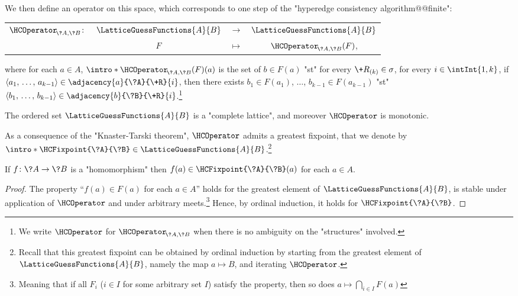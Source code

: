 We then define an operator on this space, which corresponds to one step of the "hyperedge consistency algorithm@@finite":
\begin{center}
	\begin{tabular}{rccc}
		$\HCOperator_{\!\?A,\?B}\colon$ & $\LatticeGuessFunctions{A}{B}$ & $\to$ & $\LatticeGuessFunctions{A}{B}$ \\
		& $F$ & $\mapsto$ & $\HCOperator_{\!\?A,\?B}(F)$,
	\end{tabular}
\end{center}
where for each $a \in A$, \AP$\intro*\HCOperator_{\!\?A,\?B}(F)(a)$ is the set of $b \in F(a)$ "st"
for every $\+R_{(k)} \in \sigma$, for every $i \in \intInt{1,k}$,
if $\langle a_1,\, \dotsc,\, a_{k-1} \rangle \in \adjacency{a}{\?A}{\+R}{i}$,
then there exists $b_1 \in F(a_1)$, $\dotsc$, $b_{k-1} \in F(a_{k-1})$ "st" 
$\langle b_1,\, \dotsc,\, b_{k-1} \rangle \in \adjacency{b}{\?B}{\+R}{i}$.\footnote{%
We write $\HCOperator$ for $\HCOperator_{\!\?A,\?B}$ when there is no ambiguity on
the "structures" involved.}

\begin{fact}
	The ordered set $\LatticeGuessFunctions{A}{B}$ is a "complete lattice",
	and moreover $\HCOperator$ is monotonic.
\end{fact}

As a consequence of the "Knaster-Tarski theorem", $\HCOperator$ admits a greatest fixpoint, that
we denote by \AP$\intro*\HCFixpoint{\?A}{\?B} \in \LatticeGuessFunctions{A}{B}$.\footnote{Recall 
that this greatest fixpoint can be obtained by ordinal induction by starting from
the greatest element of $\LatticeGuessFunctions{A}{B}$, namely the map $a \mapsto B$,
and iterating $\HCOperator$.}

\begin{proposition}
	\AP\label{prop:existence-homomorphism-implies-lowerbound-HC}
	If $f\colon \?A \to \?B$ is a "homomorphism" then $f(a) \in \HCFixpoint{\?A}{\?B}(a)$
	for each $a \in A$.
\end{proposition}

\begin{proof}
	The property ``$f(a) \in F(a)$ for each $a\in A$'' holds for the greatest element
	of $\LatticeGuessFunctions{A}{B}$, is stable under application of $\HCOperator$ and
	under arbitrary meets.\footnote{Meaning that if all $F_i$ ($i \in I$ for some arbitrary set $I$)
	satisfy the property, then so does $a \mapsto \bigcap_{i \in I} F(a)$}
	Hence, by ordinal induction, it holds for $\HCFixpoint{\?A}{\?B}$.
\end{proof}

